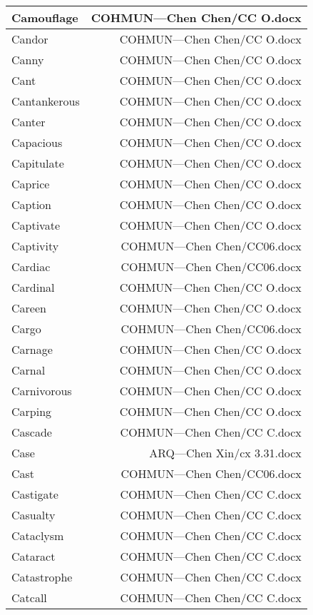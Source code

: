 \documentclass{article}
\begin{document}
\begin{center}
\begin{longtable}{|l|r|}
\hline
Camouflage  &  COHMUN---Chen Chen/CC O.docx\\  
\hline
Candor  &  COHMUN---Chen Chen/CC O.docx\\  
\hline
Canny  &  COHMUN---Chen Chen/CC O.docx\\  
\hline
Cant  &  COHMUN---Chen Chen/CC O.docx\\  
\hline
Cantankerous  &  COHMUN---Chen Chen/CC O.docx\\  
\hline
Canter  &  COHMUN---Chen Chen/CC O.docx\\  
\hline
Capacious  &  COHMUN---Chen Chen/CC O.docx\\  
\hline
Capitulate  &  COHMUN---Chen Chen/CC O.docx\\  
\hline
Caprice  &  COHMUN---Chen Chen/CC O.docx\\  
\hline
Caption  &  COHMUN---Chen Chen/CC O.docx\\  
\hline
Captivate  &  COHMUN---Chen Chen/CC O.docx\\  
\hline
Captivity  &  COHMUN---Chen Chen/CC06.docx\\  
\hline
Cardiac  &  COHMUN---Chen Chen/CC06.docx\\  
\hline
Cardinal  &  COHMUN---Chen Chen/CC O.docx\\  
\hline
Careen  &  COHMUN---Chen Chen/CC O.docx\\  
\hline
Cargo  &  COHMUN---Chen Chen/CC06.docx\\  
\hline
Carnage  &  COHMUN---Chen Chen/CC O.docx\\  
\hline
Carnal  &  COHMUN---Chen Chen/CC O.docx\\  
\hline
Carnivorous  &  COHMUN---Chen Chen/CC O.docx\\  
\hline
Carping  &  COHMUN---Chen Chen/CC O.docx\\  
\hline
Cascade  &  COHMUN---Chen Chen/CC C.docx\\  
\hline
Case  &  ARQ---Chen Xin/cx 3.31.docx\\  
\hline
Cast  &  COHMUN---Chen Chen/CC06.docx\\  
\hline
Castigate  &  COHMUN---Chen Chen/CC C.docx\\  
\hline
Casualty  &  COHMUN---Chen Chen/CC C.docx\\  
\hline
Cataclysm  &  COHMUN---Chen Chen/CC C.docx\\  
\hline
Cataract  &  COHMUN---Chen Chen/CC C.docx\\  
\hline
Catastrophe  &  COHMUN---Chen Chen/CC C.docx\\  
\hline
Catcall  &  COHMUN---Chen Chen/CC C.docx\\  

\end{longtable}
\end{center}
\end{document}

